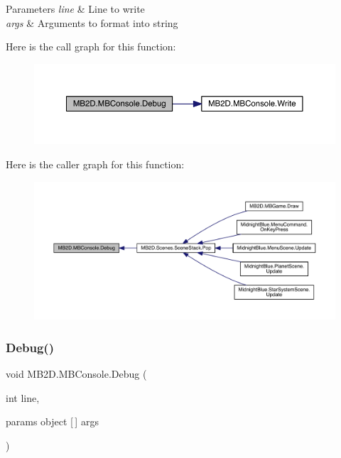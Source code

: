 \begin{DoxyParams}{Parameters}
{\em line} & Line to write\\
\hline
{\em args} & Arguments to format into string\\
\hline
\end{DoxyParams}
Here is the call graph for this function\+:
\nopagebreak
\begin{figure}[H]
\begin{center}
\leavevmode
\includegraphics[width=350pt]{class_m_b2_d_1_1_m_b_console_a6f0c0f179b2fef32a130a5e1d4957a70_cgraph}
\end{center}
\end{figure}
Here is the caller graph for this function\+:
\nopagebreak
\begin{figure}[H]
\begin{center}
\leavevmode
\includegraphics[width=350pt]{class_m_b2_d_1_1_m_b_console_a6f0c0f179b2fef32a130a5e1d4957a70_icgraph}
\end{center}
\end{figure}
\hypertarget{class_m_b2_d_1_1_m_b_console_a1235820bedb1bc0598c863a0d7033329}{}\label{class_m_b2_d_1_1_m_b_console_a1235820bedb1bc0598c863a0d7033329} 
\subsubsection{\texorpdfstring{Debug()}{Debug()}\hspace{0.1cm}{\footnotesize\ttfamily [2/4]}}
{\footnotesize\ttfamily void M\+B2\+D.\+M\+B\+Console.\+Debug (\begin{DoxyParamCaption}\item[{int}]{line,  }\item[{params object \mbox{[}$\,$\mbox{]}}]{args }\end{DoxyParamCaption})\hspace{0.3cm}{\ttfamily [inline]}}



